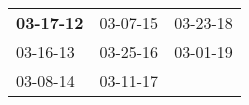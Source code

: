 \begin{supertabular}{p{0.33\columnwidth}p{0.33\columnwidth}p{0.33\columnwidth}}
 \textbf{03-17-12\textsuperscript{}} &  03-07-15\textsuperscript{} &  03-23-18\textsuperscript{} \\
          03-16-13\textsuperscript{} &  03-25-16\textsuperscript{} &  03-01-19\textsuperscript{} \\
          03-08-14\textsuperscript{} &  03-11-17\textsuperscript{} &                             \\
\end{supertabular}
